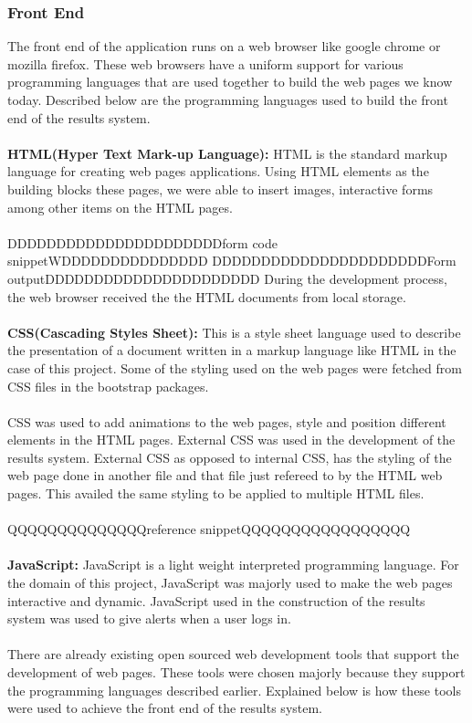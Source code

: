 \subsubsection{Front End}
The front end of the application runs on a web browser like google chrome or mozilla firefox. These web browsers have a uniform support for various programming languages that are used together to build the web pages we know today. Described below are the programming languages used to build the front end of the results system.\\\\
\textbf{HTML(Hyper Text Mark-up Language):} HTML is the standard markup language for creating web pages applications. Using HTML elements as the building blocks these pages, we were able to insert images, interactive forms among other items on the HTML pages.\\\\
DDDDDDDDDDDDDDDDDDDDDDform code snippetWDDDDDDDDDDDDDDD
DDDDDDDDDDDDDDDDDDDDDDForm outputDDDDDDDDDDDDDDDDDDDDDD
During the development process, the web browser received the the HTML documents from local storage.\\~\\
\textbf{CSS(Cascading Styles Sheet): }This is a style sheet language used to describe the presentation of a document written in a markup language like HTML in the case of this project. Some of the styling used on the web pages were fetched from CSS files in the bootstrap packages. \\\\
CSS was used to add animations to the web pages, style and position different elements in the HTML pages. External CSS was used in the development of the results system. External CSS as opposed to internal CSS, has the styling of the web page done in another file and that file just refereed to by the HTML web pages. This availed the same styling to be applied to multiple HTML files.\\~\\
QQQQQQQQQQQQQQreference snippetQQQQQQQQQQQQQQQQQ\\~\\
\textbf{JavaScript: }JavaScript is a light weight interpreted programming language. For the domain of this project, JavaScript was majorly used to make the web pages interactive and dynamic. JavaScript used in the construction of the results system was used to give alerts when a user logs in.\\~\\
There are already existing open sourced web development tools that support the development of web pages. These tools were chosen majorly because they support the programming languages described earlier. Explained below is how these tools were used to achieve the front end of the results system.\\~\\
